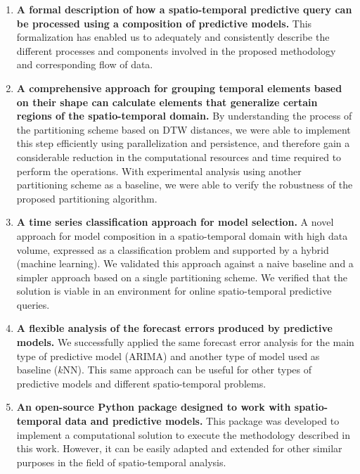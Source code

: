 \begin{enumerate}
\item \textbf{A formal description of how a spatio-temporal predictive query can be processed using a composition of predictive models.} This formalization has enabled us to adequately and consistently describe the different processes and components involved in the proposed methodology and corresponding flow of data.

\item \textbf{A comprehensive approach for grouping temporal elements based on their shape can calculate elements that generalize certain regions of the spatio-temporal domain.} By understanding the process of the partitioning scheme based on DTW distances, we were able to implement this step efficiently using parallelization and persistence, and therefore gain a considerable reduction in the computational resources and time required to perform the operations. With experimental analysis using another partitioning scheme as a baseline, we were able to verify the robustness of the proposed partitioning algorithm.

\item \textbf{A time series classification approach for model selection.} A novel approach for model composition in a spatio-temporal domain with high data volume, expressed as a classification problem and supported by a hybrid (machine learning). We validated this approach against a naive baseline and a simpler approach based on a single partitioning scheme. We verified that the solution is viable in an environment for online spatio-temporal predictive queries.

\item \textbf{A flexible analysis of the forecast errors produced by predictive models.} We successfully applied the same forecast error analysis for the main type of predictive model (ARIMA) and another type of model used as baseline ($k$NN). This same approach can be useful for other types of predictive models and different spatio-temporal problems.

\item \textbf{An open-source Python package designed to work with spatio-temporal data and predictive models.} This package was developed to implement a computational solution to execute the methodology described in this work. However, it can be easily adapted and extended for other similar purposes in the field of spatio-temporal analysis.
\end{enumerate}

